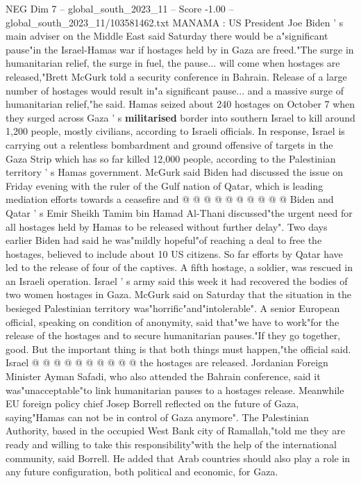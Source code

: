 \begin{textsample}{NEG Dim 7 – global\_south\_2023\_11 – Score -1.00 – global\_south\_2023\_11/103581462.txt}  \label{ex:f7_neg_157}
MANAMA : US President Joe Biden ' s main adviser on the Middle East said Saturday there would be a"significant pause"in the Israel-Hamas war if hostages held by in Gaza are freed."The surge in humanitarian relief, the surge in fuel, the pause... will come when hostages are released,"Brett McGurk told a security conference in Bahrain.
Release of a large number of hostages would result in"a significant pause... and a massive surge of humanitarian relief,"he said.
Hamas seized about 240 hostages on October 7 when they surged across Gaza ' s \textbf{militarised} border into southern Israel to kill around 1,200 people, mostly civilians, according to Israeli officials.
In response, Israel is carrying out a relentless bombardment and ground offensive of targets in the Gaza Strip which has so far killed 12,000 people, according to the Palestinian territory ' s Hamas government.
McGurk said Biden had discussed the issue on Friday evening with the ruler of the Gulf nation of Qatar, which is leading mediation efforts towards a ceasefire and @ @ @ @ @ @ @ @ @ @ Biden and Qatar ' s Emir Sheikh Tamim bin Hamad Al-Thani discussed"the urgent need for all hostages held by Hamas to be released without further delay".
Two days earlier Biden had said he was"mildly hopeful"of reaching a deal to free the hostages, believed to include about 10 US citizens.
So far efforts by Qatar have led to the release of four of the captives.
A fifth hostage, a soldier, was rescued in an Israeli operation.
Israel ' s army said this week it had recovered the bodies of two women hostages in Gaza.
McGurk said on Saturday that the situation in the besieged Palestinian territory was"horrific"and"intolerable".
A senior European official, speaking on condition of anonymity, said that"we have to work"for the release of the hostages and to secure humanitarian pauses."If they go together, good.
But the important thing is that both things must happen,"the official said.
Israel @ @ @ @ @ @ @ @ @ @ the hostages are released.
Jordanian Foreign Minister Ayman Safadi, who also attended the Bahrain conference, said it was"unacceptable"to link humanitarian pauses to a hostages release.
Meanwhile EU foreign policy chief Josep Borrell reflected on the future of Gaza, saying"Hamas can not be in control of Gaza anymore".
The Palestinian Authority, based in the occupied West Bank city of Ramallah,"told me they are ready and willing to take this responsibility"with the help of the international community, said Borrell.
He added that Arab countries should also play a role in any future configuration, both political and economic, for Gaza.

\end{textsample}
